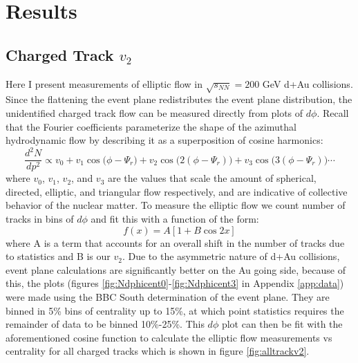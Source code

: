
\chapter{Results} %
\section{Charged Track $v_{2}$}
\label{sect:alltracks}
Here I present measurements of elliptic flow in $\sqrt{s_{NN}}=200$ GeV d+Au collisions. Since the flattening the event plane redistributes the event plane distribution, the unidentified charged track flow can be measured directly from plots of $d\phi$. Recall that the Fourier coefficients parameterize the shape of the azimuthal hydrodynamic flow by describing it as a superposition of cosine harmonics:
\begin{equation}
\frac{d^{2}N}{dp^{2}} \propto v_0 + v_1 \cos\big(\phi - \Psi_{r}\big) + v_2 \cos\big(2(\phi - \Psi_{r})\big) + v_3 \cos\big(3(\phi - \Psi_{r})\big) \cdots
\end{equation}
where $v_0$, $v_1$, $v_2$, and $v_3$ are the values that scale the amount of spherical, directed, elliptic, and triangular flow respectively, and are indicative of collective behavior of the nuclear matter. To measure the elliptic flow we count number of tracks in bins of $d\phi$ and fit this with a function of the form:
\begin{equation}
\label{v2fitfn}
f(x) = A [1 + B \cos 2x]
\end{equation}
where A is a term that accounts for an overall shift in the number of tracks due to statistics and B is our $v_2$. Due to the asymmetric nature of d+Au collisions, event plane calculations are significantly better on the Au going side, because of this, the plots (figures \ref{fig:Ndphicent0}-\ref{fig:Ndphicent3} in Appendix \ref{app:data}) were made using the BBC South determination of the event plane. They are binned in 5\% bins of centrality up to 15\%, at which point statistics requires the remainder of data to be binned 10\%-25\%. This $d\phi$ plot can then be fit with the aforementioned cosine function to calculate the elliptic flow measurements vs centrality for all charged tracks which is shown in figure \ref{fig:alltrackv2}.

